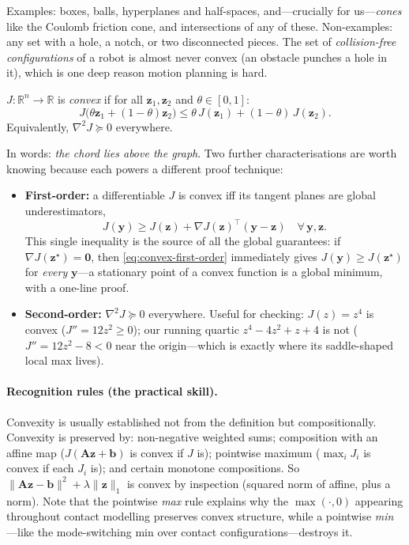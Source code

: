 \documentclass[11pt,twoside]{report}
\theoremstyle{definition}
\theoremstyle{plain}
\theoremstyle{remark}
\newcommand{\R}{\mathbb{R}}
\newcommand{\0}{\bm{0}}
\begin{document}
Examples: boxes, balls, hyperplanes and half-spaces, and---crucially for
us---\emph{cones} like the Coulomb friction cone, and intersections of
any of these. Non-examples: any set with a hole, a notch, or two
disconnected pieces. The set of \emph{collision-free configurations} of
a robot is almost never convex (an obstacle punches a hole in it), which
is one deep reason motion planning is hard.

\begin{definitionbox}
$J:\R^{n}\to\R$ is \emph{convex} if for all $\bm{z}_{1},\bm{z}_{2}$ and
$\theta\in[0,1]$:
\begin{equation}
J\bigl(\theta\bm{z}_{1}+(1{-}\theta)\bm{z}_{2}\bigr)
\le\theta\,J(\bm{z}_{1})+(1{-}\theta)\,J(\bm{z}_{2}).
\end{equation}
Equivalently, $\nabla^{2}J\succeq 0$ everywhere.
\end{definitionbox}

In words: \emph{the chord lies above the graph}. Two further
characterisations are worth knowing because each powers a different
proof technique:
\begin{itemize}
\item \textbf{First-order:} a differentiable $J$ is convex iff its
      tangent planes are global underestimators,
      \begin{equation}\label{eq:convex-first-order}
      J(\bm{y})\ge J(\bm{z})+\nabla J(\bm{z})^{\!\top}(\bm{y}-\bm{z})
      \quad\forall\,\bm{y},\bm{z}.
      \end{equation}
      This single inequality is the source of all the global guarantees:
      if $\nabla J(\bm{z}^{\star})=\0$, then
      \eqref{eq:convex-first-order} immediately gives
      $J(\bm{y})\ge J(\bm{z}^{\star})$ for \emph{every} $\bm{y}$---a
      stationary point of a convex function is a global minimum, with a
      one-line proof.
\item \textbf{Second-order:} $\nabla^{2}J\succeq 0$ everywhere.
      Useful for checking: $J(z)=z^{4}$ is convex ($J''=12z^{2}\ge 0$);
      our running quartic $z^{4}-4z^{2}+z+4$ is not
      ($J''=12z^{2}-8<0$ near the origin---which is exactly where its
      saddle-shaped local max lives).
\end{itemize}

\paragraph{Recognition rules (the practical skill).}
Convexity is usually established not from the definition but
compositionally. Convexity is preserved by: non-negative weighted sums;
composition with an affine map ($J(\bm{A}\bm{z}+\bm{b})$ is convex if
$J$ is); pointwise maximum ($\max_{i}J_{i}$ is convex if each $J_{i}$
is); and certain monotone compositions. So
$\|\bm{A}\bm{z}-\bm{b}\|^{2}+\lambda\|\bm{z}\|_{1}$ is convex by
inspection (squared norm of affine, plus a norm). Note that the
pointwise \emph{max} rule explains why the $\max(\cdot,0)$ appearing
throughout contact modelling preserves convex structure, while a
pointwise \emph{min}---like the mode-switching min over contact
configurations---destroys it.
\end{document}
